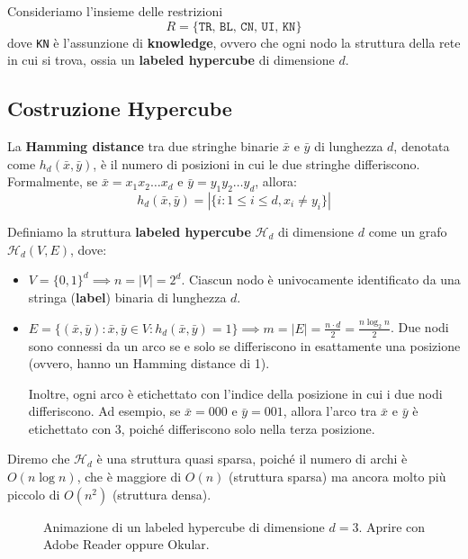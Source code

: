 Consideriamo l'insieme delle restrizioni 
\[
    R = \{\texttt{TR, BL, CN, UI, KN}\}
\]
dove \texttt{KN} è l'assunzione di \textbf{knowledge}, ovvero che ogni nodo la struttura della rete in cui si trova, ossia un \textbf{labeled hypercube} di dimensione $d$.

\subsection{Costruzione Hypercube}

\begin{definizione}
    La \textbf{Hamming distance} tra due stringhe binarie $\bar{x}$ e $\bar{y}$ di lunghezza $d$, denotata come $h_d(\bar{x}, \bar{y})$, è il numero di posizioni in cui le due stringhe differiscono. Formalmente, se $\bar{x} = x_1 x_2 \ldots x_d$ e $\bar{y} = y_1 y_2 \ldots y_d$, allora:
    \[
    h_d(\bar{x}, \bar{y}) = |\{i : 1 \leq i \leq d, x_i \neq y_i\}|
    \]
\end{definizione}

\begin{definizione}
    Definiamo la struttura \textbf{labeled hypercube} $\mathcal{H}_d$ di dimensione $d$ come un grafo $\mathcal{H}_d(V, E)$, dove:
    \begin{itemize}
        \item $V = \{0, 1\}^d \implies n = |V| = 2^d$. Ciascun nodo è univocamente identificato da una stringa (\textbf{label}) binaria di lunghezza $d$.
        \item $E = \{(\bar{x}, \bar{y}) : \bar{x}, \bar{y} \in V: h_d(\bar{x}, \bar{y}) = 1\} \implies m = |E| = \frac{n \cdot d}{2} = \frac{n \log_2n}{2}$. Due nodi sono connessi da un arco se e solo se differiscono in esattamente una posizione (ovvero, hanno un Hamming distance di 1).
        
        Inoltre, ogni arco è etichettato con l'indice della posizione in cui i due nodi differiscono. Ad esempio, se $\bar{x} = 000$ e $\bar{y} = 001$, allora l'arco tra $\bar{x}$ e $\bar{y}$ è etichettato con $3$, poiché differiscono solo nella terza posizione.
    \end{itemize}
\end{definizione}

Diremo che $\mathcal{H}_d$ è una struttura quasi sparsa, poiché il numero di archi è $O(n \log n)$, che è maggiore di $O(n)$ (struttura sparsa) ma ancora molto più piccolo di $O(n^2)$ (struttura densa).

\begin{figure}[htbp]
    \centering
    \caption{Animazione di un labeled hypercube di dimensione $d=3$. Aprire con Adobe Reader oppure Okular.}
    \label{fig:hypercube}
\end{figure}

